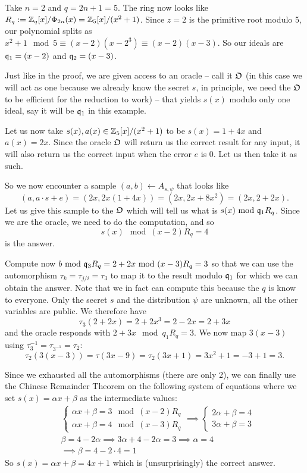 \begin{example}
	Take $n = 2$ and $q = 2n+1 = 5$. The ring now looks like $R_q := \mathbb{Z}_q[x]/\Phi_{2n}(x) = \mathbb{Z}_5[x]/(x^2+1)$. Since $z = 2$ is the primitive root modulo 5, our polynomial splits as $x^2+1 \mod 5 \equiv (x-2)(x-2^3) \equiv (x-2)(x-3)$. So our ideals are $\mathfrak{q}_1 = (x-2)$ and $\mathfrak{q}_2 = (x-3)$.

	Just like in the proof, we are given access to an oracle -- call it $\mathfrak{O}$ (in this case we will act as one because we already know the secret $s$, in principle, we need the $\mathfrak{O}$ to be efficient for the reduction to work) -- that yields $s(x)$ modulo only one ideal, say it will be $\mathfrak{q}_1$ in this example.

	Let us now take $s(x), a(x) \in \mathbb{Z}_5[x]/(x^2+1)$ to be $s(x) = 1 + 4x$ and $a(x) = 2x$. Since the oracle $\mathfrak{O}$ will return us the correct result for any input, it will also return us the correct input when the error $e$ is 0. Let us then take it as such.

	So we now encounter a sample $(a,b) \leftarrow A_{s, \psi}$ that looks like 
	\[ (a, a\cdot s + e) = (2x, 2x(1+4x)) = (2x, 2x +8x^2) = (2x, 2+2x). \]
	Let us give this sample to the $\mathfrak{O}$ which will tell us what is $s(x) \text{ mod } \mathfrak{q}_1 R_q$. Since we are the oracle, we need to do the computation, and so
	\[ s(x) \mod (x-2)R_q = 4 \]
	is the answer.

	Compute now $b \text{ mod } \mathfrak{q}_3 R_q = 2 +2x \text{ mod } (x-3)R_q = 3$ so that we can use the automorphism $\tau_k = \tau_{j/i} = \tau_3$ to map it to the result modulo $\mathfrak{q}_1$ for which we can obtain the answer. Note that we in fact can compute this because the $q$ is know to everyone. Only the secret $s$ and the distribution $\psi$ are unknown, all the other variables are public. We therefore have
	\[ \tau_3(2+2x) = 2 +2x^3 = 2 -2x = 2+3x \]
	and the oracle responds with $2+3x \mod q_1 R_q = 3$. We now map $3(x-3)$ using $\tau_3^{-1} = \tau_{3^{-1}} = \tau_2$:
	\[ \tau_2(3(x-3)) = \tau(3x-9) = \tau_2(3x+1) = 3x^2 + 1 = -3 +1 = 3. \]

	Since we exhausted all the automorphisms (there are only 2), we can finally use the Chinese Remainder Theorem on the following system of equations where we set $s(x) = \alpha x + \beta$ as the intermediate values:
	\begin{align*} & \begin{cases}
		\alpha x + \beta = 3 \mod (x-2)R_q \\
		\alpha x + \beta = 4 \mod (x-3)R_q
	\end{cases} \implies 
	\begin{cases} 
		2 \alpha + \beta = 4 \\
		3 \alpha + \beta = 3
	\end{cases} \\
				   & \beta = 4 - 2 \alpha \implies 3 \alpha + 4 - 2 \alpha = 3 \implies \alpha = 4 \\
				   & \implies \beta = 4-2\cdot 4 = 1
\end{align*}
So $s(x) = \alpha x + \beta = 4x + 1$ which is (unsurprisingly) the correct answer.	
\end{example}
